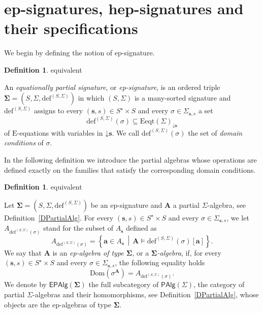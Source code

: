 \documentclass[a4paper, reqno]{amsbook}
\makeatletter
\newcommand{\vs}[1]{\mathbin{\downarrow}#1}
\newcommand{\sig}[1]{\mathbf{#1}}             %
\newcommand{\Dom}{\mathrm{Dom}}
\theoremstyle{plain}
\theoremstyle{definition}
\newtheorem{definition}[theorem]{Definition}
\newcommand*{\CA@leanpending}{}
\newcommand*{\CA@leanrelation}{}
\newcommand*{\lean}[2]{%
  \ifcsname\string\color@lean@#1\endcsname\else
    \PackageError{main}{Unknown relation `#1' in \string\lean}{Use equivalent, weaker or stronger.}%
  \fi
  \gdef\CA@leanrelation{#1}%
  \gdef\CA@leanpending{#2}}
\makeatother
\begin{document}
\section{ep-signatures, hep-signatures and their specifications}\label{SEpSig}

We begin by defining the notion of ep-signature.

\begin{definition}\label{DEpSig}\lean{equivalent}{EPSignature}
An \emph{equationally partial signature}, or \emph{ep-signature}, is an ordered triple $\sig{\Sigma}=(S,\Sigma,\mathrm{def}^{(S,\Sigma)})$ in which $(S,\Sigma)$ is a many-sorted signature and $\mathrm{def}^{(S,\Sigma)}$ assigns to every $(\mathbf{s},s)\in S^{\star}\times S$ and every $\sigma\in\Sigma_{\mathbf{s},s}$ a set
$$
\mathrm{def}^{(S,\Sigma)}(\sigma)\subseteq\mathrm{Eeqt}(\Sigma)_{\vs{\mathbf{s}}}
$$
of $\mathrm{E}$-equations with variables in $\vs{\mathbf{s}}$.
We call $\mathrm{def}^{(S,\Sigma)}(\sigma)$ the set of \emph{domain conditions} of $\sigma$.
\end{definition}

In the following definition we introduce the partial algebras whose operations are defined exactly on the families that satisfy the corresponding domain conditions.

\begin{definition}\label{DEpAlg}\lean{equivalent}{EPSignature.IsEPAlgebra}
Let $\sig{\Sigma}=(S,\Sigma,\mathrm{def}^{(S,\Sigma)})$ be an ep-signature and $\mathbf{A}$ a partial $\Sigma$-algebra, see Definition~\ref{DPartialAlg}.
For every $(\mathbf{s},s)\in S^{\star}\times S$ and every $\sigma\in\Sigma_{\mathbf{s},s}$, we let $A_{\mathrm{def}^{(S,\Sigma)}(\sigma)}$ stand for the subset of $A_{\mathbf{s}}$ defined as
$$
A_{\mathrm{def}^{(S,\Sigma)}(\sigma)}=\left\lbrace\mathbf{a}\in A_{\mathbf{s}}\,\middle|\,\mathbf{A}\models\mathrm{def}^{(S,\Sigma)}(\sigma)[\mathbf{a}]\right\rbrace.
$$
We say that $\mathbf{A}$ is an \emph{ep-algebra of type $\sig{\Sigma}$}, or a \emph{$\sig{\Sigma}$-algebra}, if, for every $(\mathbf{s},s)\in S^{\star}\times S$ and every $\sigma\in\Sigma_{\mathbf{s},s}$, the following equality holds
$$
\Dom\left(\sigma^{\mathbf{A}}\right)=A_{\mathrm{def}^{(S,\Sigma)}(\sigma)}.
$$
We denote by $\mathsf{EPAlg}(\sig{\Sigma})$ the full subcategory of $\mathsf{PAlg}(\Sigma)$, the category of partial $\Sigma$-algebras and their homomorphisms, see Definition~\ref{DPartialAlg}, whose objects are the ep-algebras of type $\sig{\Sigma}$.
\end{definition}
\end{document}
